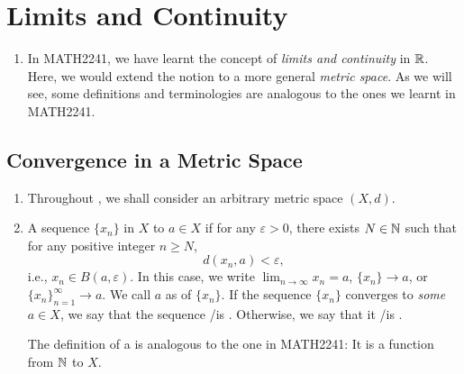 \section{Limits and Continuity}
\label{sect:limits-and-cont}
\begin{enumerate}
\item In MATH2241, we have learnt the concept of \emph{limits and continuity}
in \(\mathbb{R}\). Here, we would extend the notion to a more general \emph{metric
space}. As we will see, some definitions and terminologies are analogous to the
ones we learnt in MATH2241.
\end{enumerate}
\subsection{Convergence in a Metric Space}
\label{subsect:conv-ms}
\begin{enumerate}
\item Throughout , we shall consider an arbitrary metric
space \((X,d)\).
\item A sequence \(\{x_n\}\) in \(X\)  to \(a\in X\) if for any
\(\varepsilon>0\), there exists \(N\in\mathbb{N}\) such that for any positive integer
\(n\ge N\),
\[
d(x_n,a)<\varepsilon,
\]
i.e., \(x_n\in B(a,\varepsilon)\).  In this case, we write \(
\lim_{n\to \infty}x_n=a\), \(\{x_n\}\to a\), or \(\{x_n\}_{n=1}^{\infty}\to
a\). We call \(a\) as  of \(\{x_n\}\). If the sequence \(\{x_n\}\)
converges to \emph{some} \(a\in X\), we say that the sequence
/is . Otherwise, we say that it
/is .

\begin{note}
The definition of a  is analogous to the one in MATH2241: It is
a function from \(\mathbb{N}\) to \(X\).
\end{note}


\end{enumerate}

